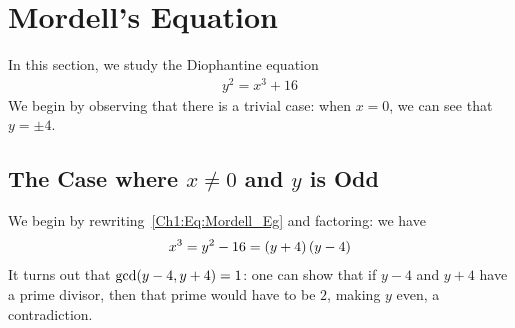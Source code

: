 \section{Mordell's Equation}

In this section, we study the Diophantine equation
\begin{align}
    y^2 = x^3 + 16
    \label{Ch1:Eq:Mordell_Eg}
\end{align}
We begin by observing that there is a trivial case: when $x = 0$, we can see that $y = \pm 4$.

\subsection{The Case where $x \neq 0$ and $y$ is Odd}

We begin by rewriting~\eqref{Ch1:Eq:Mordell_Eg} and factoring: we have
\begin{align*}
    x^3 = y^2 - 16 = \left( y + 4 \right)\left( y - 4 \right)
\end{align*}
It turns out that $\gcd\!\left( y - 4, y + 4 \right) = 1$: one can show that if $y - 4$ and $y + 4$ have a prime divisor, then that prime would have to be $2$, making $y$ even, a contradiction.

